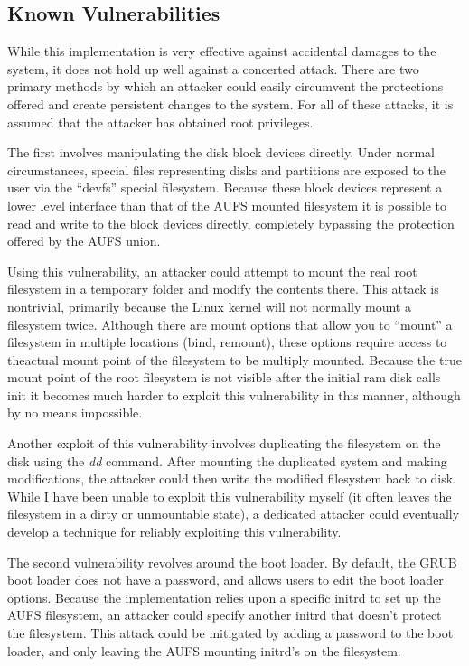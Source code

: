 \documentclass[12pt]{article}
\begin{document}

\subsection{Known Vulnerabilities}
While this implementation is very effective against accidental damages to
the system, it does not hold up well against a concerted attack. There are two
primary methods by which an attacker could easily circumvent the protections
offered and create persistent changes to the system. For all of these attacks,
it is assumed that the attacker has obtained root privileges.

The first involves manipulating the disk block devices directly. 
Under normal circumstances, special files representing disks and partitions
are exposed to the user via the ``devfs'' special filesystem.  Because these 
block devices represent a lower level interface than that of the AUFS mounted
filesystem it is possible to read and write to the block devices directly, 
completely bypassing the protection offered by the AUFS union.

Using this vulnerability, an attacker could attempt to mount the real root
filesystem in a temporary folder and modify the contents there.  This attack 
is nontrivial, primarily because the Linux kernel will not normally mount
a filesystem twice.  Although there are mount options that allow you to 
``mount'' a filesystem in multiple locations (bind, remount), 
these options require access to theactual mount point of the filesystem to 
be multiply mounted. Because the true mount point of the root filesystem is
not visible after the initial ram disk calls init it becomes much harder to
exploit this vulnerability in this manner, although by no means impossible.

Another exploit of this vulnerability involves duplicating the filesystem on
the disk using the \emph{dd} command.  After mounting the duplicated system and
making modifications, the attacker could then write the modified filesystem
back to disk.  While I have been unable to exploit this vulnerability myself
(it often leaves the filesystem in a dirty or unmountable state), a dedicated
attacker could eventually develop a technique for reliably exploiting this
vulnerability.

The second vulnerability revolves around the boot loader.  By default, the 
GRUB boot loader does not have a password, and allows users to edit the boot
loader options.  Because the implementation relies upon a specific initrd
to set up the AUFS filesystem, an attacker could specify another initrd 
that doesn't protect the filesystem.  This attack could be mitigated by 
adding a password to the boot loader, and only leaving the AUFS mounting 
initrd's on the filesystem.
\end{document}
